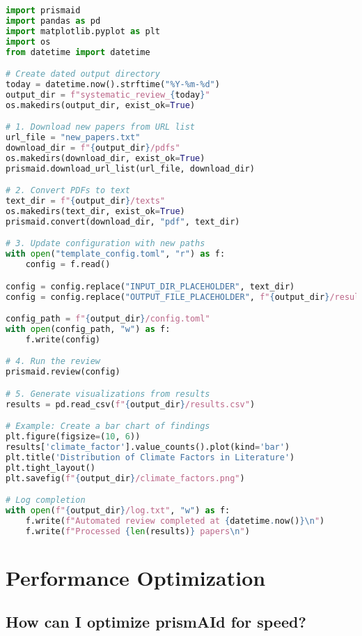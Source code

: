 \begin{commandbox}
\begin{lstlisting}[language=Python]
import prismaid
import pandas as pd
import matplotlib.pyplot as plt
import os
from datetime import datetime

# Create dated output directory
today = datetime.now().strftime("%Y-%m-%d")
output_dir = f"systematic_review_{today}"
os.makedirs(output_dir, exist_ok=True)

# 1. Download new papers from URL list
url_file = "new_papers.txt"
download_dir = f"{output_dir}/pdfs"
os.makedirs(download_dir, exist_ok=True)
prismaid.download_url_list(url_file, download_dir)

# 2. Convert PDFs to text
text_dir = f"{output_dir}/texts"
os.makedirs(text_dir, exist_ok=True)
prismaid.convert(download_dir, "pdf", text_dir)

# 3. Update configuration with new paths
with open("template_config.toml", "r") as f:
    config = f.read()

config = config.replace("INPUT_DIR_PLACEHOLDER", text_dir)
config = config.replace("OUTPUT_FILE_PLACEHOLDER", f"{output_dir}/results")

config_path = f"{output_dir}/config.toml"
with open(config_path, "w") as f:
    f.write(config)

# 4. Run the review
prismaid.review(config)

# 5. Generate visualizations from results
results = pd.read_csv(f"{output_dir}/results.csv")

# Example: Create a bar chart of findings
plt.figure(figsize=(10, 6))
results['climate_factor'].value_counts().plot(kind='bar')
plt.title('Distribution of Climate Factors in Literature')
plt.tight_layout()
plt.savefig(f"{output_dir}/climate_factors.png")

# Log completion
with open(f"{output_dir}/log.txt", "w") as f:
    f.write(f"Automated review completed at {datetime.now()}\n")
    f.write(f"Processed {len(results)} papers\n")
\end{lstlisting}
\end{commandbox}

\section{Performance Optimization}

\subsection{How can I optimize prismAId for speed?}

